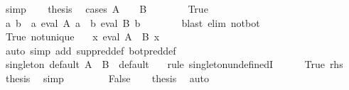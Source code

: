 \begin{isabellebody}
\ simp\isanewline
\ \ \isamarkupfalse%
\ {\isacharquery}{\kern0pt}thesis\ \isamarkupfalse%
\ {\isacharparenleft}{\kern0pt}cases\ {\isachardoublequoteopen}A\ {\isasymnoteq}\ {\isasymbottom}\ {\isasymand}\ B\ {\isasymnoteq}\ {\isasymbottom}{\isachardoublequoteclose}{\isacharparenright}{\kern0pt}\isanewline
\ \ \ \ \isamarkupfalse%
\ True\isanewline
\ \ \ \ \isamarkupfalse%
\ \isamarkupfalse%
\ a\ b\ \ a{\isacharcolon}{\kern0pt}\ {\isachardoublequoteopen}eval\ A\ a{\isachardoublequoteclose}\ \ b{\isacharcolon}{\kern0pt}\ {\isachardoublequoteopen}eval\ B\ b{\isachardoublequoteclose}\isanewline
\ \ \ \ \ \ \isamarkupfalse%
\ {\isacharparenleft}{\kern0pt}blast\ elim{\isacharcolon}{\kern0pt}\ not{\isacharunderscore}{\kern0pt}bot{\isacharparenright}{\kern0pt}\isanewline
\ \ \ \ \isamarkupfalse%
\ True\ not{\isacharunderscore}{\kern0pt}unique\ \isamarkupfalse%
\ {\isachardoublequoteopen}{\isasymnot}\ {\isacharparenleft}{\kern0pt}{\isasymexists}{\isacharbang}{\kern0pt}x{\isachardot}{\kern0pt}\ eval\ {\isacharparenleft}{\kern0pt}A\ {\isasymsqunion}\ B{\isacharparenright}{\kern0pt}\ x{\isacharparenright}{\kern0pt}{\isachardoublequoteclose}\isanewline
\ \ \ \ \ \ \isamarkupfalse%
\ {\isacharparenleft}{\kern0pt}auto\ simp\ add{\isacharcolon}{\kern0pt}\ sup{\isacharunderscore}{\kern0pt}pred{\isacharunderscore}{\kern0pt}def\ bot{\isacharunderscore}{\kern0pt}pred{\isacharunderscore}{\kern0pt}def{\isacharparenright}{\kern0pt}\isanewline
\ \ \ \ \isamarkupfalse%
\ \isamarkupfalse%
\ {\isachardoublequoteopen}singleton\ default\ {\isacharparenleft}{\kern0pt}A\ {\isasymsqunion}\ B{\isacharparenright}{\kern0pt}\ {\isacharequal}{\kern0pt}\ default\ {\isacharparenleft}{\kern0pt}{\isacharparenright}{\kern0pt}{\isachardoublequoteclose}\ \isamarkupfalse%
\ {\isacharparenleft}{\kern0pt}rule\ singleton{\isacharunderscore}{\kern0pt}undefinedI{\isacharparenright}{\kern0pt}\isanewline
\ \ \ \ \isamarkupfalse%
\ True\ rhs\ \isamarkupfalse%
\ {\isacharquery}{\kern0pt}thesis\ \isamarkupfalse%
\ simp\isanewline
\ \ \isamarkupfalse%
\isanewline
\ \ \ \ \isamarkupfalse%
\ False\ \isamarkupfalse%
\ \isamarkupfalse%
\ {\isacharquery}{\kern0pt}thesis\ \isamarkupfalse%
\ auto\isanewline
\ \ \isamarkupfalse%
\isanewline
{}\isamarkupfalse%

\end{isabellebody}
